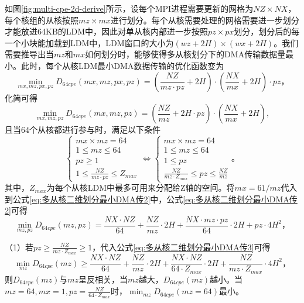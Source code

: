 \documentclass[degree=doctor]{thuthesis}
\begin{document}
如图\ref{fig:multi-cpe-2d-derive}所示，设每个MPI进程需要更新的网格为$NZ\times NX$，每个核组的从核按照$mz \times mx$进行划分。每个从核需要处理的网格需要进一步划分才能放进64KB的LDM中，因此对单从核内部进一步按照$pz\times px$划分，划分后的每一个小块能加载到LDM中，LDM窗口的大小为$(wz+2H)\times(wx+2H)$。我们需要推导出当$mz$和$mx$如何划分时，能够使得多从核划分下的DMA传输数据量最小。此时，每个从核LDM最小DMA数据传输的优化函数变为
\begin{equation}
  \min_{mx,mz,px,pz} D_{64cpe}(mx,mz,px,pz) = (\frac{NZ}{mz\cdot pz}+2H)\cdot(\frac{NX}{mx}+2H)\cdot pz，
  \label{eq:多从核二维划分最小DMA传输}
\end{equation}
化简可得
\begin{equation}
  \min_{mx,mz,pz} D_{64cpe}(mx,mz,pz) = (\frac{NZ}{mz}+2H\cdot pz)\cdot(\frac{NX}{mx}+2H),
  \label{eq:多从核二维划分最小DMA传2}
\end{equation}
且当64个从核都进行参与时，满足以下条件
\begin{equation*}
    \left\{\begin{matrix}
mx\times mz=64\\
1\le mz \le 64 \\
pz \ge 1 \\
1 \le \frac{NZ}{mz\cdot pz} \le Z_{max}
\end{matrix}\right.
\Leftrightarrow
  \left\{\begin{matrix}
mx\times mz=64\\
1\le mz \le 64 \\
1 \le pz \\
\frac{NZ}{mz\cdot Z_{max}} \le pz \le \frac{NZ}{mz}
\end{matrix}\right.。
\end{equation*}
其中，$Z_{max}$为每个从核LDM中最多可用来分配给Z轴的空间。将$mx=61/mz$代入到公式\ref{eq:多从核二维划分最小DMA传2}中，公式\ref{eq:多从核二维划分最小DMA传2}可得
\begin{equation}
  \min_{mz,pz} D_{64cpe}(mz,pz) = \frac{NX\cdot NZ}{64}+\frac{NZ}{mz}\cdot 2H+\frac{NX\cdot mz \cdot pz}{64} \cdot 2H + pz\cdot 4H^2，
  \label{eq:多从核二维划分最小DMA传3}
\end{equation}

（1）若$pz \ge \frac{NZ}{mz\cdot Z_{max}} \ge 1$，代入公式\ref{eq:多从核二维划分最小DMA传3}可得
\begin{equation}
  \min_{mz} D_{64cpe}(mz) \ge \frac{NX\cdot NZ}{64}+\frac{NZ}{mz}\cdot 2H+\frac{NX\cdot NZ}{64\cdot Z_{max}} \cdot 2H + \frac{NZ}{mz\cdot Z_{max}}\cdot 4H^2，
  \label{eq:多从核二维划分最小DMA传4}
\end{equation}
则$D_{64cpe}(mz) $与$mz$呈反相关，当$mz$越大，$D_{64cpe}(mz) $越小。当$mz=64, mx=1, pz = \frac{NZ}{64\cdot Z_{max}}$时，$\min_{mz} D_{64cpe}(mz=64)$最小。
\end{document}
